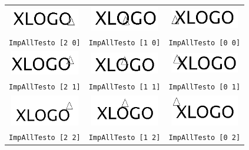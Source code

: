 \begin{center}
	\begin{tabular}{|c|c|c|}
		\hline
		\includegraphics[width=3cm]{pics/fap20.png} & \includegraphics[width=3cm]{pics/fap10.png} & \includegraphics[width=3cm]{pics/fap00.png} \\
		\texttt{ImpAllTesto [2 0]} & \texttt{ImpAllTesto [1 0]} & \texttt{ImpAllTesto [0 0]}\\
		\hline
		\includegraphics[width=3cm]{pics/fap21.png}& \includegraphics[width=3cm]{pics/fap11.png} & \includegraphics[width=3cm]{pics/fap01.png} \\
		\texttt{ImpAllTesto [2 1]} & \texttt{ImpAllTesto [1 1]} & \texttt{ImpAllTesto [0 1]}\\
		\hline
		\includegraphics[width=3cm]{pics/fap22.png}& \includegraphics[width=3cm]{pics/fap12.png} & \includegraphics[width=3cm]{pics/fap02.png} \\
		\texttt{ImpAllTesto [2 2]} & \texttt{ImpAllTesto [1 2]} & \texttt{ImpAllTesto [0 2]}\\
		\hline
	\end{tabular}
\end{center}
